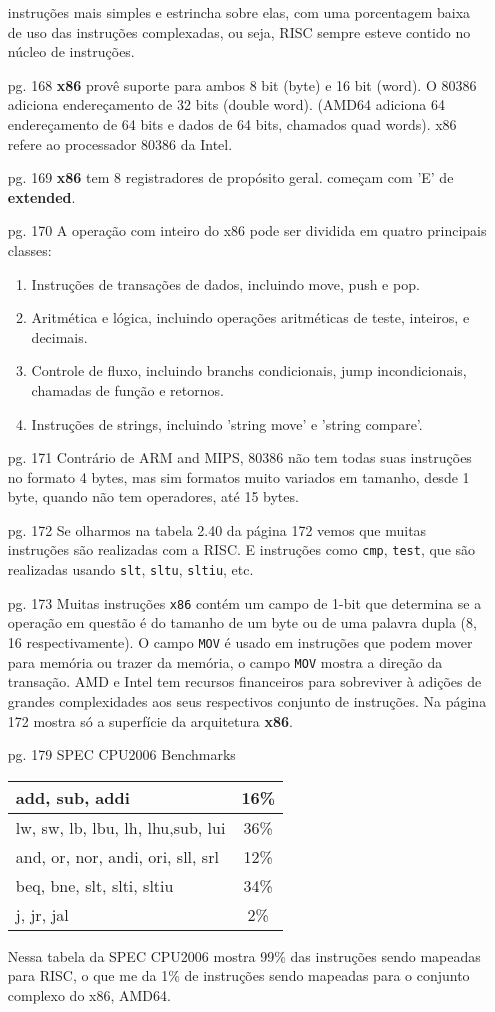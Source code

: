 \documentclass{article}
\begin{document}
\begin{enumerate}
instruções mais simples e estrincha sobre elas, com uma porcentagem baixa de uso
das instruções complexadas, ou seja, RISC sempre esteve contido no núcleo
de instruções.
\item[pg. 168] \textbf{x86} provê suporte para ambos 8 bit (byte) e 16 bit 
(word). O 80386 adiciona endereçamento de 32 bits (double word). (AMD64 
adiciona 64 endereçamento de 64 bits e dados de 64 bits, chamados quad words). 
x86 refere ao processador 80386 da Intel.
\item[pg. 169] \textbf{x86} tem 8 registradores de propósito geral. começam com 
'E' de \textbf{extended}.
\item[pg. 170] A operação com inteiro do x86 pode ser dividida em quatro 
principais classes:
\begin{enumerate}
\item Instruções de transações de dados, incluindo move, push e pop.
\item Aritmética e lógica, incluindo operações aritméticas de teste, inteiros, 
e decimais.
\item Controle de fluxo, incluindo branchs condicionais, jump incondicionais, 
chamadas de função e retornos.
\item Instruções de strings, incluindo 'string move' e 'string compare'.
\end{enumerate}
\item[pg. 171] Contrário de ARM and MIPS, 80386 não tem todas suas instruções 
no formato 4 bytes, mas sim formatos muito variados em tamanho, desde 1 byte, 
quando não tem operadores, até 15 bytes.
\item[pg. 172] Se olharmos na tabela 2.40 da página 172 vemos que muitas 
instruções são realizadas com a RISC. E instruções como \verb|cmp|, 
\verb|test|, que são 
realizadas usando \verb|slt|, \verb|sltu|, \verb|sltiu|, etc.
\item[pg. 173] Muitas instruções \verb|x86| contém um campo de 1-bit que
determina se a operação em questão é do tamanho de um byte ou de uma palavra
dupla (8, 16 respectivamente). O campo \verb|MOV| é usado em instruções que
podem mover para memória ou trazer da memória, o campo \verb|MOV| mostra a
direção da transação. AMD e Intel tem recursos financeiros para sobreviver à
adições de grandes complexidades aos seus respectivos conjunto de instruções. Na
página 172 mostra só a superfície da arquitetura \textbf{x86}.
\item[pg. 179] SPEC CPU2006 Benchmarks
\begin{tabular}{|l|c|}
\hline add, sub, addi & 16\% \\ 
\hline lw, sw, lb, lbu, lh, lhu,sub, lui & 36\% \\ 
\hline and, or, nor, andi, ori, sll, srl & 12\% \\ 
\hline beq, bne, slt, slti, sltiu & 34\% \\ 
\hline j, jr, jal & 2\% \\ 
\hline 
\end{tabular}
Nessa tabela da SPEC CPU2006 mostra 99\% das instruções sendo mapeadas para 
RISC, o que me da 1\% de instruções sendo mapeadas para o conjunto complexo do 
x86, AMD64.

\end{enumerate}
\end{document}
